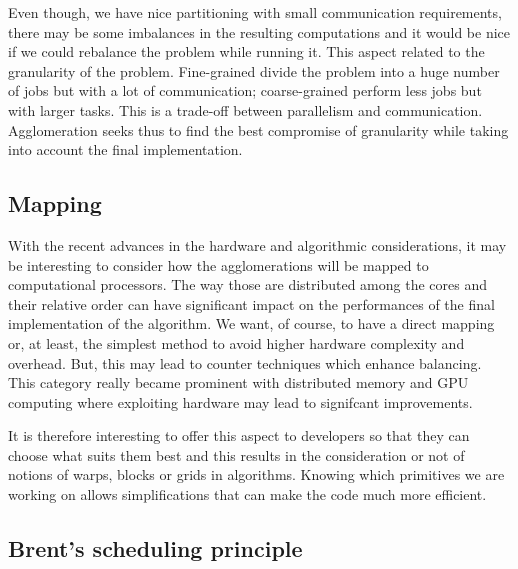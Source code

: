Even though, we have nice partitioning with small communication requirements, there may be some imbalances in the resulting computations and it would be nice if we could rebalance the problem while running it. This aspect related to the granularity of the problem. Fine-grained divide the problem into a huge number of jobs but with a lot of communication; coarse-grained perform less jobs but with larger tasks. This is a trade-off between parallelism and communication. Agglomeration seeks thus to find the best compromise of granularity while taking into account the final implementation.

\subsection{Mapping}

With the recent advances in the hardware and algorithmic considerations, it may be interesting to consider how the agglomerations will be mapped to computational processors. The way those are distributed among the cores and their relative order can have significant impact on the performances of the final implementation of the algorithm. We want, of course, to have a direct mapping or, at least, the simplest method to avoid higher hardware complexity and overhead. But, this may lead to counter techniques which enhance balancing. This category really became prominent with distributed memory and GPU computing where exploiting hardware may lead to signifcant improvements.

It is therefore interesting to offer this aspect to developers so that they can choose what suits them best and this results in the consideration or not of notions of warps, blocks or grids in algorithms. Knowing which primitives we are working on allows simplifications that can make the code much more efficient.

\subsection{Brent's scheduling principle}

